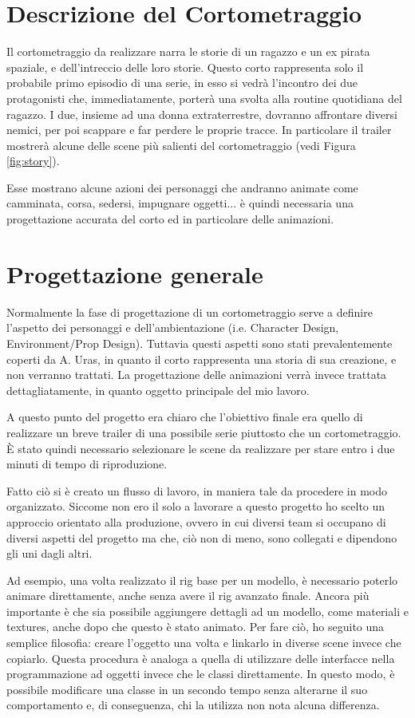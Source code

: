 \section{Descrizione del Cortometraggio}

Il cortometraggio da realizzare narra le storie di un ragazzo e un ex pirata spaziale, e dell'intreccio delle loro storie.
Questo corto rappresenta solo il probabile primo episodio di una serie, in esso si vedrà l'incontro dei due protagonisti che, immediatamente, porterà una svolta alla routine quotidiana del ragazzo.
I due, insieme ad una donna extraterrestre, dovranno affrontare diversi nemici, per poi scappare e far perdere le proprie tracce.
In particolare il trailer mostrerà alcune delle scene più salienti del cortometraggio (vedi Figura \ref{fig:story}).


Esse mostrano alcune azioni dei personaggi che andranno animate come camminata, corsa, sedersi, impugnare oggetti... è quindi necessaria una progettazione accurata del corto ed in particolare delle animazioni.

\section{Progettazione generale}

Normalmente la fase di progettazione di un cortometraggio serve a definire l'aspetto dei personaggi e dell'ambientazione (i.e. Character Design, Environment/Prop Design).
Tuttavia questi aspetti sono stati prevalentemente coperti da A. Uras, in quanto il corto rappresenta una storia di sua creazione, e non verranno trattati. La progettazione delle animazioni verrà invece trattata dettagliatamente, in quanto oggetto principale del mio lavoro.

A questo punto del progetto era chiaro che l'obiettivo finale era quello di realizzare un breve trailer di una possibile serie piuttosto che un cortometraggio.
È stato quindi necessario selezionare le scene da realizzare per stare entro i due minuti di tempo di riproduzione.

Fatto ciò si è creato un flusso di lavoro, in maniera tale da procedere in modo organizzato.
Siccome non ero il solo a lavorare a questo progetto ho scelto un approccio orientato alla produzione, ovvero in cui diversi team si occupano di diversi aspetti del progetto ma che, ciò non di meno, sono collegati e dipendono gli uni dagli altri.

Ad esempio, una volta realizzato il rig base per un modello, è necessario poterlo animare direttamente, anche senza avere il rig avanzato finale. Ancora più importante è che sia possibile aggiungere dettagli ad un modello, come materiali e textures, anche dopo che questo è stato animato.
Per fare ciò, ho seguito una semplice filosofia: creare l'oggetto una volta e linkarlo in diverse scene invece che copiarlo.
Questa procedura è analoga a quella di utilizzare delle interfacce nella programmazione ad oggetti invece che le classi direttamente. In questo modo, è possibile modificare una classe in un secondo tempo senza alterarne il suo comportamento e, di conseguenza, chi la utilizza non nota alcuna differenza.

